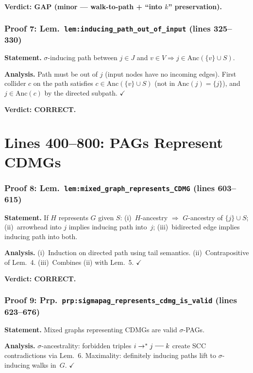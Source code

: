 \documentclass{article}
\begin{document}
\textbf{Verdict: GAP (minor --- walk-to-path + ``into $k$'' preservation).}

\section{Proof 7: Lem.\ \texttt{lem:inducing\_path\_out\_of\_input} (lines 325--330)}
\textbf{Statement.} $\sigma$-inducing path between $j\in J$ and $v\in V\Rightarrow
j\in\mathrm{Anc}(\{v\}\cup S)$.

\textbf{Analysis.} Path must be out of $j$ (input nodes have no incoming edges).
First collider $c$ on the path satisfies $c\in\mathrm{Anc}(\{v\}\cup S)$ (not in
$\mathrm{Anc}(j)=\{j\}$), and $j\in\mathrm{Anc}(c)$ by the directed subpath.
$\checkmark$

\textbf{Verdict: CORRECT.}

\part*{Lines 400--800: PAGs Represent CDMGs}

\section{Proof 8: Lem.\ \texttt{lem:mixed\_graph\_represents\_CDMG} (lines 603--615)}
\textbf{Statement.} If $H$ represents $G$ given $S$: (i)~$H$-ancestry $\Rightarrow$
$G$-ancestry of $\{j\}\cup S$; (ii)~arrowhead into $j$ implies inducing path into~$j$;
(iii)~bidirected edge implies inducing path into both.

\textbf{Analysis.} (i)~Induction on directed path using tail semantics.
(ii)~Contrapositive of Lem.~4. (iii)~Combines (ii) with Lem.~5.  $\checkmark$

\textbf{Verdict: CORRECT.}

\section{Proof 9: Prp.\ \texttt{prp:sigmapag\_represents\_cdmg\_is\_valid}
(lines 623--676)}
\textbf{Statement.} Mixed graphs representing CDMGs are valid $\sigma$-PAGs.

\textbf{Analysis.} $\sigma$-ancestrality: forbidden triples $i\to^*j\tut k$
create SCC contradictions via Lem.~6.  Maximality: definitely inducing paths
lift to $\sigma$-inducing walks in~$G$.  $\checkmark$
\end{document}
